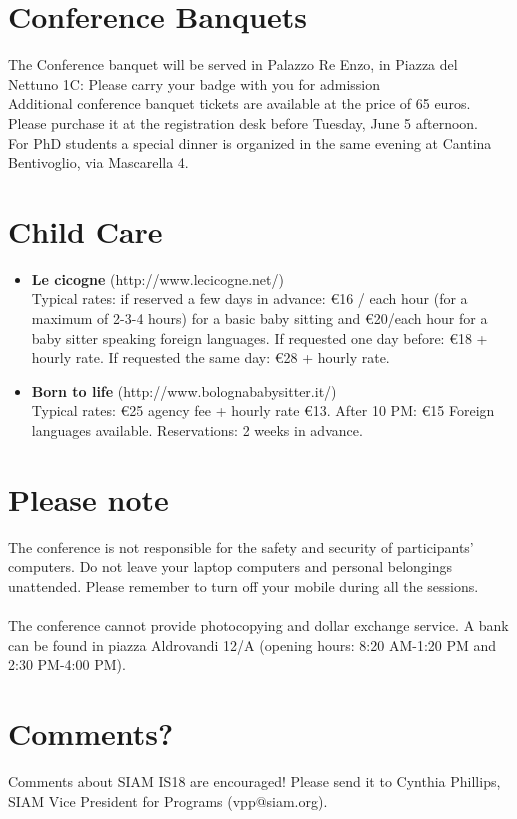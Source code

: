 \section*{Conference Banquets}
The Conference banquet will be served in Palazzo Re Enzo, in Piazza del Nettuno 1C: Please carry your badge with you for admission\\ 
Additional conference banquet tickets are available at the price of 65 euros. 
Please purchase it at the registration desk before Tuesday, June 5 afternoon.\\
For PhD students a special dinner is organized in the same evening at Cantina Bentivoglio, via Mascarella 4.

\section*{Child Care}
\begin{itemize}
  \item[] \textbf{Le cicogne} (http://www.lecicogne.net/)\\
Typical rates: if reserved a few days in advance: \euro 16 / each hour (for a maximum of 2-3-4 hours) for a basic baby sitting and \euro 20/each hour for a baby sitter speaking foreign languages.
If requested one day before: \euro 18 + hourly rate.
If requested the same day: \euro 28 + hourly rate.
  \item[] \textbf{Born to life} (http://www.bolognababysitter.it/)\\
Typical rates: \euro 25 agency fee + hourly rate \euro 13. After 10 PM: \euro 15 Foreign languages available. Reservations: 2 weeks in advance.
\end{itemize}

\section*{Please note}
The conference is not responsible for the safety and security of participants' computers. Do not leave your laptop computers and personal belongings unattended. Please remember to turn off your mobile during all the sessions.\\\\ The conference cannot provide photocopying and dollar exchange service. A bank can be found in piazza Aldrovandi 12/A (opening hours: 8:20 AM-1:20 PM and 2:30 PM-4:00 PM).

\section*{Comments?}
Comments about SIAM IS18 are encouraged! Please send it to Cynthia Phillips, SIAM Vice President for Programs (vpp@siam.org).
